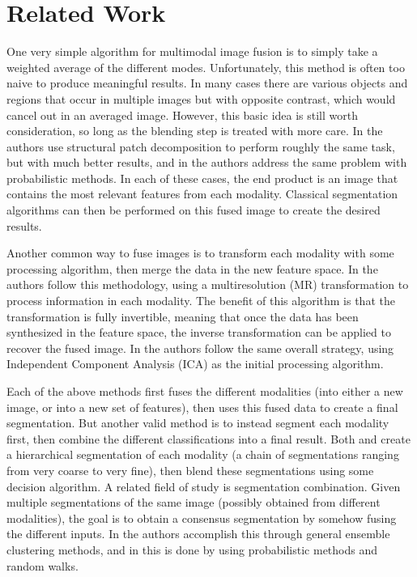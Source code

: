 \documentclass[journal]{IEEEtran}
\begin{document}
\section{Related Work}
\label{sec:related}


One very simple algorithm for multimodal image fusion is to simply take a
weighted average of the different modes. Unfortunately, this method is often too
naive to produce meaningful results. In many cases there are various objects and
regions that occur in multiple images but with opposite contrast, which would
cancel out in an averaged image. However, this basic idea is still worth
consideration, so long as the blending step is treated with more care. In
\cite{7859418} the authors use structural patch decomposition to perform roughly
the same task, but with much better results, and in \cite{5773085} the authors
address the same problem with probabilistic methods. In each of these cases, the
end product is an image that contains the most relevant features from each
modality. Classical segmentation algorithms can then be performed on this fused
image to create the desired results.

Another common way to fuse images is to transform each modality with some
processing algorithm, then merge the data in the new feature space. In
\cite{Piella2003259} the authors follow this methodology, using a
multiresolution (MR) transformation to process information in each modality. The
benefit of this algorithm is that the transformation is fully invertible,
meaning that once the data has been synthesized in the feature space, the
inverse transformation can be applied to recover the fused image. In
\cite{4154667,Mitianoudis2007131} the authors follow the same overall strategy,
using Independent Component Analysis (ICA) as the initial processing algorithm.

Each of the above methods first fuses the different modalities (into either a
new image, or into a new set of features), then uses this fused data to create a
final segmentation. But another valid method is to instead segment each modality
first, then combine the different classifications into a final result. Both
\cite{Tochon2015} and \cite{Randrianasoa2015} create a hierarchical segmentation
of each modality (a chain of segmentations ranging from very coarse to very
fine), then blend these segmentations using some decision algorithm. A related
field of study is segmentation combination. Given multiple segmentations of the
same image (possibly obtained from different modalities), the goal is to obtain
a consensus segmentation by somehow fusing the different inputs. In
\cite{Franek2011} the authors accomplish this through general ensemble
clustering methods, and in \cite{Wattuya2008} this is done by using
probabilistic methods and random walks.
\end{document}
